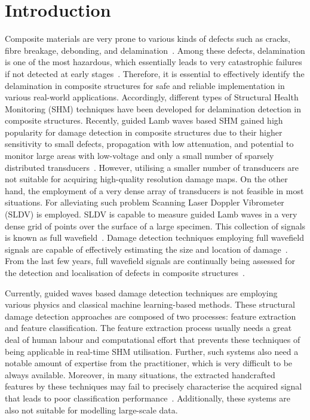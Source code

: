 \section{Introduction}
Composite materials are very prone to various kinds of defects such as cracks, fibre breakage, debonding, and delamination~\cite{ip2004delamination, smith2009composite}. 
Among these defects, delamination is one of the most hazardous, which essentially leads to very catastrophic failures if not detected at early stages~\cite{valdes1999delamination}. 
Therefore, it is essential to effectively identify the delamination in composite structures for safe and reliable implementation in various real-world applications.  
Accordingly, different types of Structural Health Monitoring (SHM) techniques have been developed for delamination detection in composite structures. 
Recently, guided Lamb waves based SHM gained high popularity for damage detection in composite structures due to their higher sensitivity to small defects, propagation with low attenuation, and potential to monitor large areas with low-voltage and only a small number of sparsely distributed transducers~\cite{alleyne1992interaction, giurgiutiu2003lamb, Ihn2008, mitra2016guided}. 
However, utilising a smaller number of transducers are not suitable for acquiring high-quality resolution damage maps. 
On the other hand, the employment of a very dense array of transducers is not feasible in most situations. 
For alleviating such problem Scanning Laser Doppler Vibrometer (SLDV) is employed. 
SLDV is capable to measure guided Lamb waves in a very dense grid of points over the surface of a large specimen. 
This collection of signals is known as full wavefield~\cite{Radzienski2019a}. 
Damage detection techniques employing full wavefield signals are capable of effectively estimating the size and location of damage~\cite{Girolamo2018a, kudela2018impact}. From the last few years, full wavefield signals are continually being assessed for the detection and localisation of defects in composite structures~\cite{Radzienski2019a, kudela2018impact, sohn2011delamination, sohn2011automated, rogge2013characterization}.

Currently, guided waves based damage detection techniques are employing various physics and classical machine learning-based methods. 
These structural damage detection approaches are composed of two processes: feature extraction and feature classification. 
The feature extraction process usually needs a great deal of human labour and computational effort that prevents these techniques of being applicable in real-time SHM utilisation. 
Further, such systems also need a notable amount of expertise from the practitioner, which is very difficult to be always available.
Moreover, in many situations, the extracted handcrafted features by these techniques may fail to precisely characterise the acquired signal that leads to poor classification performance~\cite{Zhao2019b, Yuan2020}. 
Additionally, these systems are also not suitable for modelling large-scale data.

